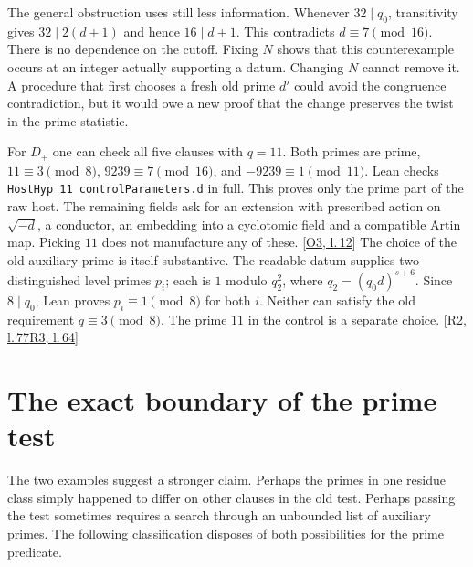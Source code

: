\documentclass[12pt,letterpaper]{article}
\newcommand{\id}[1]{{\small\nolinkurl{#1}}}
\begin{document}
The general obstruction uses still less information. Whenever $32\mid q_0$, transitivity gives $32\mid 2(d+1)$ and hence $16\mid d+1$. This contradicts $d\equiv7\pmod{16}$. There is no dependence on the cutoff. Fixing $N$ shows that this counterexample occurs at an integer actually supporting a datum. Changing $N$ cannot remove it. A procedure that first chooses a fresh old prime $d'$ could avoid the congruence contradiction, but it would owe a new proof that the change preserves the twist in the prime statistic.

For $D_+$ one can check all five clauses with $q=11$. Both primes are prime, $11\equiv3\pmod8$, $9239\equiv7\pmod{16}$, and $-9239\equiv1\pmod{11}$. Lean checks \id{HostHyp 11 controlParameters.d} in full. This proves only the prime part of the raw host. The remaining fields ask for an extension with prescribed action on $\sqrt{-d}$, a conductor, an embedding into a cyclotomic field and a compatible Artin map. Picking $11$ does not manufacture any of these. {\footnotesize\sffamily\color{mute}[\href{https://github.com/nousentllc/riemann-hypothesis/blob/40e56bab026552e089d7afcfeff08d2defb9c005/src/Formalism/SharpRestriction/RamificationFrobenius/TotientGaloisClasses/ConjEMemHostFIff.lean\#L12}{O3, l.\,12}]}
The choice of the old auxiliary prime is itself substantive. The readable datum supplies two distinguished level primes $p_i$; each is $1$ modulo $q_2^2$, where $q_2=(q_0d)^{s+6}$. Since $8\mid q_0$, Lean proves $p_i\equiv1\pmod8$ for both $i$. Neither can satisfy the old requirement $q\equiv3\pmod8$. The prime $11$ in the control is a separate choice. {\footnotesize\sffamily\color{mute}[\href{https://github.com/leanprover-community/riemann-hypothesis/blob/e063a923620ee7787b4a1270421478645bf66bdb/src/New/Reduction/Data/AdmissibleData.lean\#L77}{R2, l.\,77}\enspace \href{https://github.com/leanprover-community/riemann-hypothesis/blob/e063a923620ee7787b4a1270421478645bf66bdb/src/New/Reduction/Data/FieldsAndPlaces.lean\#L64}{R3, l.\,64}]}

\section{The exact boundary of the prime test}\label{sec:class}
The two examples suggest a stronger claim. Perhaps the primes in one residue class simply happened to differ on other clauses in the old test. Perhaps passing the test sometimes requires a search through an unbounded list of auxiliary primes. The following classification disposes of both possibilities for the prime predicate.
\end{document}
